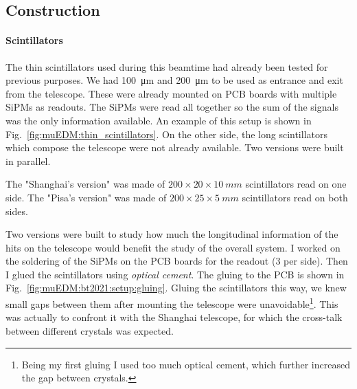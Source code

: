 \begin{refsection}
    \subsection{Construction}
        \paragraph{Scintillators}
        The thin scintillators used during this beamtime had already been tested for previous purposes. 
        We had \SI{100}{\micro m} and \SI{200}{\micro m} to be used as entrance and exit from the telescope.
        These were already mounted on PCB boards with multiple SiPMs as readouts. The SiPMs were read all together so the sum of the signals was the only information available.
        An example of this setup is shown in Fig.~\ref{fig:muEDM:thin_scintillators}.
        On the other side, the long scintillators which compose the telescope were not already available.
        Two versions were built in parallel.
        \begin{outline}
            \1 The "Shanghai's version" was made of $200\times 20\times\SI{10}{mm}$ scintillators read on one side.
            \1 The "Pisa's version" was made of $200\times 25\times\SI{5}{mm}$ scintillators read on both sides.
        \end{outline}
        Two versions were built to study how much the longitudinal information of the hits on the telescope would benefit the study of the overall system.
        I worked on the soldering of the SiPMs on the PCB boards for the readout (3 per side).
        Then I glued the scintillators using \textit{optical cement}.
        The gluing to the PCB is shown in Fig.~\ref{fig:muEDM:bt2021:setup:gluing}.
        Gluing the scintillators this way, we knew small gaps between them after mounting the telescope were unavoidable\footnote{Being my first gluing I used too much optical cement, which further increased the gap between crystals.}. 
        This was actually to confront it with the Shanghai telescope, for which the cross-talk between different crystals was expected.


\end{refsection}
